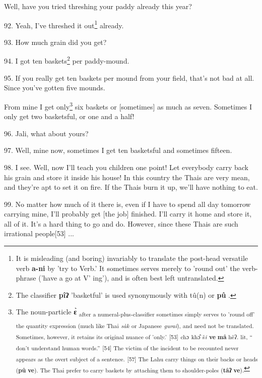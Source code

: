 Well, have you tried threshing your paddy already this year?

92. Yeah, I've threshed it out\footnote{It is misleading (and boring) invariably to translate the post-head versatile verb \textbf{a-ni} by 'try to Verb.' It sometimes serves merely to 'round out' the verb-phrase ('have a go at V' ing'), and is often best left untranslated.} already.

93. How much grain did you get?

94. I got ten baskets\footnote{The classifier \textbf{pîʔ} 'basketful' is used synonymously with tû(n) or \textbf{pû} .} per paddy-mound.

95. If you really get ten baskets per mound from your field, that's not bad at
all. Since you've gotten five mounds.

From mine I get only\footnote{The noun-particle \textbf{ɛ̀} \textsubscript{after a numeral-plus-classifier sometimes simply serves to 'round off' the quantity expression (much like Thai }\textsubscript{\textit{sàk }}\textsubscript{or Japanese }\textsubscript{\textit{gurai}}\textsubscript{), and need not be translated. Sometimes, however, it retains its original nuance of 'only.'} \textsubscript{[53] }\textsubscript{ch}\textsubscript{ɔ}\textsubscript{ kh}\textsubscript{ɔ̂}\textsubscript{ š}\textsubscript{\textit{\emph{i}}}\textsubscript{ \textbf{ve} \textbf{mâ} hê}\textsubscript{ʔ. lit, `` don't understand human words.''} \textsubscript{[54] The victim of the incident to be recounted never appears as the overt subject of a sentence. } \textsubscript{[57] The Lahu carry things on their backs or heads (\textbf{pû} \textbf{ve}). The Thai prefer to carry baskets by attaching them to shoulder-poles (\textbf{tâʔ} \textbf{ve}).}} six baskets or [sometimes] as much as seven. Sometimes
I only get two basketsful, or one and a half!

96. Jali, what about yours?

97. Well, mine now, sometimes I get ten basketsful and sometimes fifteen.

98. I see. Well, now I'll teach you children one point! Let everybody carry back
his grain and store it inside his house! In this country the Thais are very mean,
and they're apt to set it on fire. If the Thais burn it up, we'll have nothing
to eat.

99. No matter how much of it there is, even if I have to spend all day tomorrow
carrying mine, I'll probably get [the job] finished. I'll carry it home and store
it, all of it. It's a hard thing to go and do. However, since these Thais are
such irrational people[53] ...


